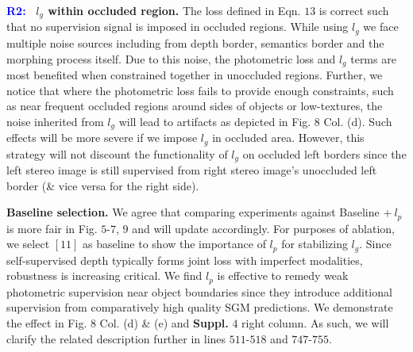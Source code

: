 \documentclass[10pt,twocolumn,letterpaper]{article}
\newcommand{\Paragraph}[1]{\vspace{0.40mm} \noindent \textbf{#1} \hspace{0mm}}
\begin{document}

\Paragraph{\textcolor{blue}{R2:~}}
\textbf{$l_g$ within occluded region.}
The loss defined in Eqn. $13$ is correct such that no supervision signal is imposed in occluded regions. 
While using $l_g$ we face multiple noise sources including from depth border, semantics border and the morphing process itself. %
Due to this noise, the photometric loss and $l_g$ terms are most benefited when constrained together in unoccluded regions. 
Further, we notice that where the photometric loss fails to provide enough constraints, such as near frequent occluded regions around sides of objects or low-textures, the noise inherited from $l_g$ will lead to artifacts as depicted in Fig. $8$ Col. (d).
Such effects will be more severe if we impose $l_g$ in occluded area.
However, this strategy will not discount the functionality of $l_g$ on occluded left borders since the left stereo image is still supervised from right stereo image's unoccluded left border (\& vice versa for the right side). 

\Paragraph{Baseline selection.} 
We agree that comparing experiments against Baseline $ +~{l_p}$ is more fair in Fig. $5\text{-}7$, $9$ and will update accordingly. 
For purposes of ablation, we select $[11]$ as baseline to show the importance of $l_p$ for stabilizing $l_g$. 
Since self-supervised depth typically forms joint loss with imperfect modalities, robustness is increasing critical. %
We find ${l_p}$ is effective to remedy weak photometric supervision near object boundaries since they introduce additional supervision from comparatively high quality SGM predictions. 
We demonstrate the effect in Fig. $8$ Col. (d) \& (e) and \textbf{Suppl.} $4$ right column. 
As such, we will clarify the related description further in lines $511\text{-}518$ and $747\text{-}755$.
\end{document}
